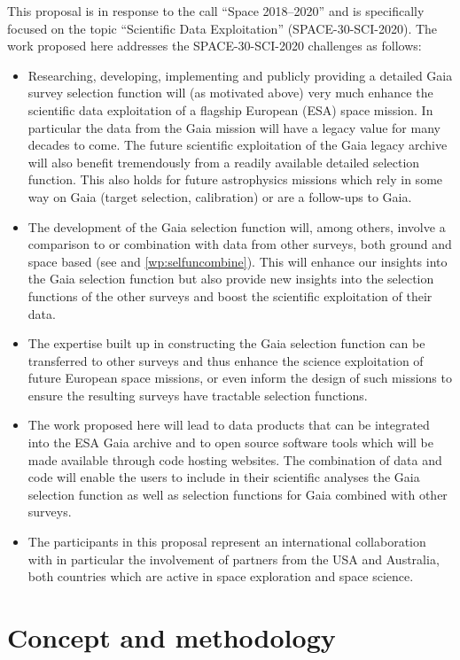 This proposal is in response to the call ``Space 2018--2020'' and is specifically focused on the topic ``Scientific Data Exploitation'' (SPACE-30-SCI-2020). The work proposed here addresses the SPACE-30-SCI-2020 challenges as follows:
\begin{itemize}
    \item Researching, developing, implementing and publicly providing a detailed Gaia survey selection function will (as motivated above) very much enhance the scientific data exploitation of a flagship European (ESA) space mission. In particular the data from the Gaia mission will have a legacy value for many decades to come. The future scientific exploitation of the Gaia legacy archive will also benefit tremendously from a readily available detailed selection function. This also holds for future astrophysics missions which rely in some way on Gaia (target selection, calibration) or are a follow-ups to Gaia.
    \item The development of the Gaia selection function will, among others, involve a comparison to or combination with data from other surveys, both ground and space based (see  and \ref{wp:selfuncombine}). This will enhance our insights into the Gaia selection function but also provide new insights into the selection functions of the other surveys and boost the scientific exploitation of their data.
    \item The expertise built up in constructing the Gaia selection function can be transferred to other surveys and thus enhance the science exploitation of future European space missions, or even inform the design of such missions to ensure the resulting surveys have tractable selection functions.
    \item The work proposed here will lead to data products that can be integrated into the ESA Gaia archive and to open source software tools which will be made available through code hosting websites. The combination of data and code will enable the users to include in their scientific analyses the Gaia selection function as well as selection functions for Gaia combined with other surveys.
    \item The participants in this proposal represent an international collaboration with in particular the involvement of partners from the USA and Australia, both countries which are active in space exploration and space science.
\end{itemize}

\section{Concept and methodology}
\label{sec:conceptandmethods}

